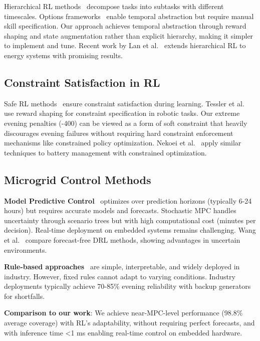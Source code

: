 \documentclass[11pt,a4paper]{article}
\begin{document}
Hierarchical RL methods~\cite{barto2003,sutton1999} decompose tasks into subtasks with different timescales. Options frameworks~\cite{sutton1999} enable temporal abstraction but require manual skill specification. Our approach achieves temporal abstraction through reward shaping and state augmentation rather than explicit hierarchy, making it simpler to implement and tune. Recent work by Lan et al.~\cite{lan2024hier} extends hierarchical RL to energy systems with promising results.

\subsection{Constraint Satisfaction in RL}

Safe RL methods~\cite{garcia2015} ensure constraint satisfaction during learning. Tessler et al.~\cite{tessler2018} use reward shaping for constraint specification in robotic tasks. Our extreme evening penalties (-400) can be viewed as a form of soft constraint that heavily discourages evening failures without requiring hard constraint enforcement mechanisms like constrained policy optimization. Nekoei et al.~\cite{liu2024safe} apply similar techniques to battery management with constrained optimization.

\subsection{Microgrid Control Methods}

\textbf{Model Predictive Control}~\cite{parisio2014,kou2016} optimizes over prediction horizons (typically 6-24 hours) but requires accurate models and forecasts. Stochastic MPC handles uncertainty through scenario trees but with high computational cost (minutes per decision). Real-time deployment on embedded systems remains challenging. Wang et al.~\cite{wang2025forecast} compare forecast-free DRL methods, showing advantages in uncertain environments.

\textbf{Rule-based approaches}~\cite{reilly2020} are simple, interpretable, and widely deployed in industry. However, fixed rules cannot adapt to varying conditions. Industry deployments typically achieve 70-85\% evening reliability with backup generators for shortfalls.

\textbf{Comparison to our work}: We achieve near-MPC-level performance (98.8\% average coverage) with RL's adaptability, without requiring perfect forecasts, and with inference time <1 ms enabling real-time control on embedded hardware.
\end{document}
